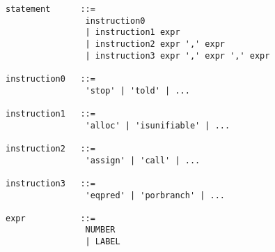 \begin{verbatim}
statement      ::=
                instruction0
                | instruction1 expr
                | instruction2 expr ',' expr
                | instruction3 expr ',' expr ',' expr

instruction0   ::=
                'stop' | 'told' | ...

instruction1   ::=
                'alloc' | 'isunifiable' | ...

instruction2   ::=
                'assign' | 'call' | ...

instruction3   ::=
                'eqpred' | 'porbranch' | ...

expr           ::=
                NUMBER
                | LABEL
\end{verbatim}
